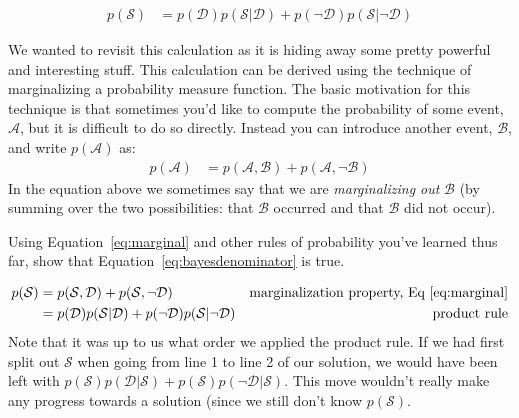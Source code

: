 \documentclass[assignment01_Solutions]{subfiles}
\begin{document}
\begin{align}
p(\mathcal{S}) &= p(\mathcal{D}) p(\mathcal{S}|\mathcal{D}) + p(\neg \mathcal{D}) p(\mathcal{S} | \neg \mathcal{D})
\end{align}

We wanted to revisit this calculation as it is hiding away some pretty powerful and interesting stuff.  This calculation can be derived using the technique of marginalizing a probability measure function.  The basic motivation for this technique is that sometimes you'd like to compute the probability of some event, $\mathcal{A}$, but it is difficult to do so directly.  Instead you can introduce another event, $\mathcal{B}$, and write $p(\mathcal{A})$ as:
\begin{align}
p(\mathcal{A}) &= p(\mathcal{A}, \mathcal{B}) + p(\mathcal{A}, \neg \mathcal{B}) \label{eq:marginal}
\end{align}
In the equation above we sometimes say that we are \emph{marginalizing out} $\mathcal{B}$ (by summing over the two possibilities: that $\mathcal{B}$ occurred and that $\mathcal{B}$ did not occur).

\begin{exercise}[(15 minutes)]
Using Equation~\ref{eq:marginal} and other rules of probability you've learned thus far, show that Equation~\ref{eq:bayesdenominator} is true.

\begin{boxedsolution}
\begin{align}
p(\mathcal{S}) &= p(\mathcal{S}, \mathcal{D}) + p(\mathcal{S}, \neg \mathcal{D}) & \mbox{marginalization property, Eq~\ref{eq:marginal}} \nonumber \\
&= p(\mathcal{D})p(\mathcal{S}|\mathcal{D}) + p(\neg \mathcal{D}) p(\mathcal{S} | \neg \mathcal{D})& \mbox{product rule} \nonumber
\end{align}
Note that it was up to us what order we applied the product rule.  If we had first split out $\mathcal{S}$ when going from line 1 to line 2 of our solution, we would have been left with $p(\mathcal{S})p(\mathcal{D}|\mathcal{S}) + p(\mathcal{S}) p(\neg \mathcal{D} | \mathcal{S})$.  This move wouldn't really make any progress towards a solution (since we still don't know $p(\mathcal{S})$.

\end{boxedsolution}
\end{exercise}
\end{document}
